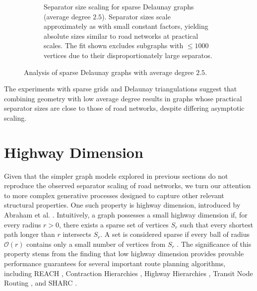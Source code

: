 \begin{figure}[tbhp]
\begin{subfigure}{0.55\linewidth}
        \caption{Separator size scaling for sparse Delaunay graphs (average degree \(2.5\)). Separator sizes scale approximately as  with small constant factors, yielding absolute sizes similar to road networks at practical scales. The fit shown excludes subgraphs with \( \le 1000 \) vertices due to their disproportionately large separatos.}
        \label{fig:sparse_delaunay_sep_plot}
    \end{subfigure}
    \caption{Analysis of sparse Delaunay graphs with average degree \(2.5\).}
    \label{fig:sparse_delaunay_separators}
\end{figure}

The experiments with sparse grids and Delaunay triangulations suggest that combining geometry with low average degree results in graphs whose practical separator sizes are close to those of road networks, despite differing asymptotic scaling.

\section{Highway Dimension}
\label{sec:synthetic:highway_dimension}

Given that the simpler graph models explored in previous sections do not reproduce the observed  separator scaling of road networks, we turn our attention to more complex generative processes designed to capture other relevant structural properties.
One such property is highway dimension, introduced by Abraham et al. \cite{abraham_highway_2010}.
Intuitively, a graph possesses a small highway dimension if, for every radius \(r > 0\), there exists a sparse set of vertices \(S_r\) such that every shortest path longer than \(r\) intersects \(S_r\).
A set is considered sparse if every ball of radius \(\mathcal{O}(r)\) contains only a small number of vertices from \(S_r\) \cite{abraham_highway_2010}.
The significance of this property stems from the finding that low highway dimension provides provable performance guarantees for several important route planning algorithms, including REACH \cite{goldberg_reach_2006}, Contraction Hierarchies \cite{geisberger_contraction_2008}, Highway Hierarchies \cite{sanders_highway_2005}, Transit Node Routing \cite{bast_fast_2007}, and SHARC \cite{bauer_sharc_2010}.

